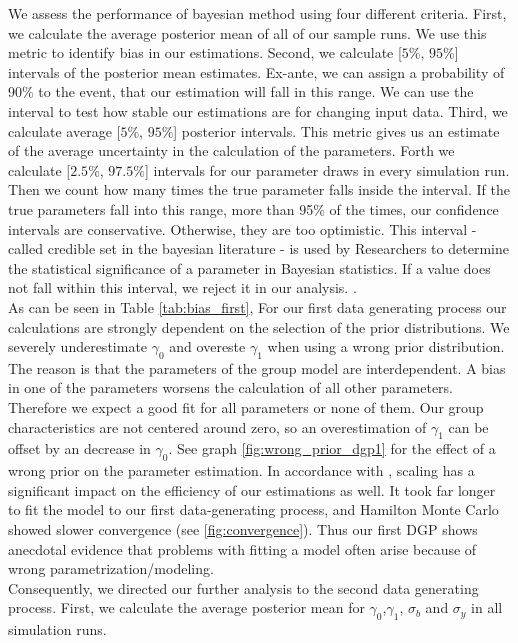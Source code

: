 We assess the performance of bayesian method using four different criteria.
First, we calculate the average posterior mean of all of our sample runs. We use this metric to identify bias in our estimations. 
Second, we calculate [$5\text{\%}$, $95\text{\%}$] intervals of the posterior mean estimates. Ex-ante, we can assign a probability of 90\% to the event, that our estimation will fall in this range. We can use the interval to test how stable our estimations are for changing input data. 
Third, we calculate average [$5\text{\%}$, $95\text{\%}$] posterior intervals. This metric gives us an estimate of the average uncertainty in the calculation of the parameters.
Forth we calculate [$2.5\text{\%}$, $97.5\text{\%}$] intervals for our parameter draws in every simulation run. Then we count how many times the true parameter falls inside the interval. If the true parameters fall into this range, more than 95\% of the times, our confidence intervals are conservative. Otherwise, they are too optimistic. This interval - called credible set in the bayesian literature - is used by Researchers to determine the statistical significance of a parameter in Bayesian statistics. If a value does not fall within this interval, we reject it in our analysis. \cite{koop2003}.\\
As can be seen in Table  \ref{tab:bias_first}, For our first data generating process our calculations are strongly dependent on the selection of the prior distributions. We severely underestimate $\gamma_0$ and overeste $\gamma_1$ when using a wrong prior distribution. The reason is that the parameters of the group model are interdependent. A bias in one of the parameters worsens the calculation of all other parameters.  Therefore we expect a good fit for all parameters or none of them. Our group characteristics are not centered around zero, so an overestimation of $\gamma_1$  can be offset by an decrease in $\gamma_0$. See graph \ref{fig:wrong_prior_dgp1} for the effect of a wrong prior on the parameter estimation.
In accordance with \cite{gelman2008weakly}, scaling has a significant impact on the efficiency of our estimations as well. 
It took far longer to fit the model to our first data-generating process, and Hamilton Monte Carlo showed slower convergence (see \ref{fig:convergence}). Thus our first DGP shows anecdotal evidence that problems with fitting a model often arise because of wrong parametrization/modeling.\\
Consequently, we directed our further analysis to the second data generating process.
First, we calculate the average posterior mean for $\gamma_0$,$\gamma_1$, $\sigma_b $ and $\sigma_y$ in all simulation runs.

